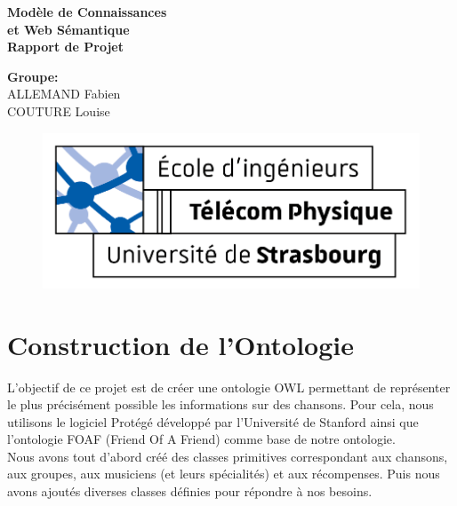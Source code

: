 \documentclass{article}
\begin{document}
\thispagestyle{empty}
\addtocounter{page}{-1}
\begin{center}
	\baselineskip=50pt
	\vspace*{1cm}
	\textbf{{\Huge Modèle de Connaissances\\et Web Sémantique}}\\
	\vspace*{0.25cm}
	\textbf{{\Huge Rapport de Projet}}\\
	\vspace*{0.25cm}
	\begin{minipage}[c]{.46\linewidth}
        \centering
        \textbf{Groupe:}\\
		ALLEMAND Fabien\\
        COUTURE Louise
    \end{minipage}
\end{center}
\vspace{0.1cm}

\begin{figure}[H]
\centering
\centerline{\includegraphics[scale=2]{img/logo_TPS_2.png}}
\end{figure}

\newpage
\section{Construction de l'Ontologie}

L'objectif de ce projet est de créer une ontologie OWL permettant de représenter le plus précisément possible les informations sur des chansons. Pour cela, nous utilisons le logiciel Protégé développé par l'Université de Stanford ainsi que l'ontologie FOAF (Friend Of A Friend) comme base de notre ontologie.\\
Nous avons tout d'abord créé des classes primitives correspondant aux chansons, aux groupes, aux musiciens (et leurs spécialités) et aux récompenses. Puis nous avons ajoutés diverses classes définies pour répondre à nos besoins.
\end{document}
